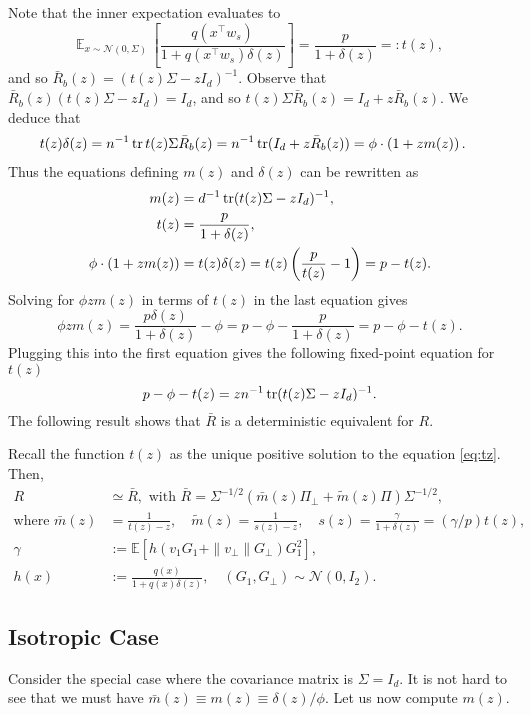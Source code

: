 Note that the inner expectation evaluates to
$$
\mathbb E_{x \sim \mathcal N(0,\Sigma)}\,\left[\frac{q(x^\top w_s)}{1+q(x^\top w_s)\delta(z)}\right] = \frac{p}{1+\delta(z)}=:t(z),
$$
and so $\bar R_b(z) = (t(z)\Sigma-z I_d)^{-1}$. Observe that $\bar R_b(z)(t(z)\Sigma-zI_d) = I_d$, and so $t(z)\Sigma\bar R_b(z) = I_d+z\bar R_b(z)$. We deduce that
\begin{align*}
t(z)\delta(z) &= n^{-1}\operatorname{tr} t(z)\Sigma \bar R_b(z) = n^{-1}\operatorname{tr} (I_d+z \bar R_b(z))=\phi\cdot\left(1+zm(z)\right).
\end{align*}
Thus the equations defining $m(z)$ and $\delta(z)$ can be rewritten as 
\begin{align}
m(z) &=  d^{-1}\operatorname{tr} (t(z)\Sigma-z I_d)^{-1},\\
t(z) &= \frac{p}{1+\delta(z)},\\
\phi\cdot(1+zm(z)) &= t(z)\delta(z) = t(z)\left(\frac{p}{t(z)}-1\right)=p-t(z).
\end{align}
Solving for $\phi z m(z)$ in terms of $t(z)$ in the last equation gives
$$
\phi zm(z) = \frac{p\delta(z)}{1+\delta(z)}-\phi = p-\phi - \frac{p}{1+\delta(z)}=p-\phi-t(z).
$$
Plugging this into the first equation gives the following fixed-point equation for $t(z)$
\begin{equation}
p-\phi-t(z) = zn^{-1}\operatorname{tr}(t(z)\Sigma-zI_d)^{-1}.
\label{eq:tz}
\end{equation}
The following result shows that $\bar R$ is a deterministic equivalent for $R$.
\begin{proposition}
Recall the function $t(z)$ as the unique positive solution to the equation \eqref{eq:tz}. Then,
\begin{align}
    R &\simeq \bar R,\text{ with }\bar R = \Sigma^{-1/2}(\bar m(z)\Pi_\perp + \tilde m(z)\Pi)\Sigma^{-1/2},\\
    \text{where }\bar m(z) &= \frac{1}{t(z)-z},\quad \tilde m(z) = \frac{1}{s(z)-z},\quad s(z) = \frac{\gamma}{1+\delta(z)}=(\gamma/p)t(z),\\
\gamma &:= \mathbb E [h(v_1 G_1 + \|v_\perp\|G_\perp )G_1 ^2],\\
h(x) &:= \frac{q(x)}{1+q(x)\delta(z)},\quad (G_1 ,G_\perp) \sim \mathcal N(0,I_2).
\end{align}
\label{prop:deterministic-equivalents}
\end{proposition}


\subsection{Isotropic Case}
Consider the special case where the covariance matrix is $\Sigma=I_d$. It is not hard to see that we must have $\bar m(z) \equiv m(z) \equiv \delta(z)/\phi$.
Let us now compute $m(z)$.

